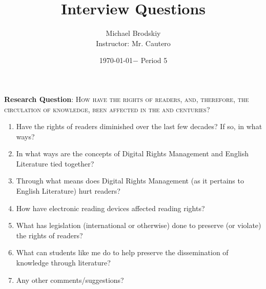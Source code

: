 \documentclass[12pt]{article}
\title{Interview Questions}
\date{\today $-$ Period 5}
\author{Michael Brodskiy\\ \small Instructor: Mr. Cautero}
\begin{document}
\maketitle

\begin{center}
  \textbf{Research Question}: \textsc{How have the rights of readers, and, therefore, the circulation of knowledge, been affected in the  and  centuries?}
\end{center}

\begin{enumerate}

  \item Have the rights of readers diminished over the last few decades? If so, in what ways?

  \item In what ways are the concepts of Digital Rights Management and English Literature tied together?

  \item Through what means does Digital Rights Management (as it pertains to English Literature) hurt readers?

  \item How have electronic reading devices affected reading rights?

  \item What has legislation (international or otherwise) done to preserve (or violate) the rights of readers?

  \item What can students like me do to help preserve the dissemination of knowledge through literature?

  \item Any other comments/suggestions?

\end{enumerate}
\end{document}
